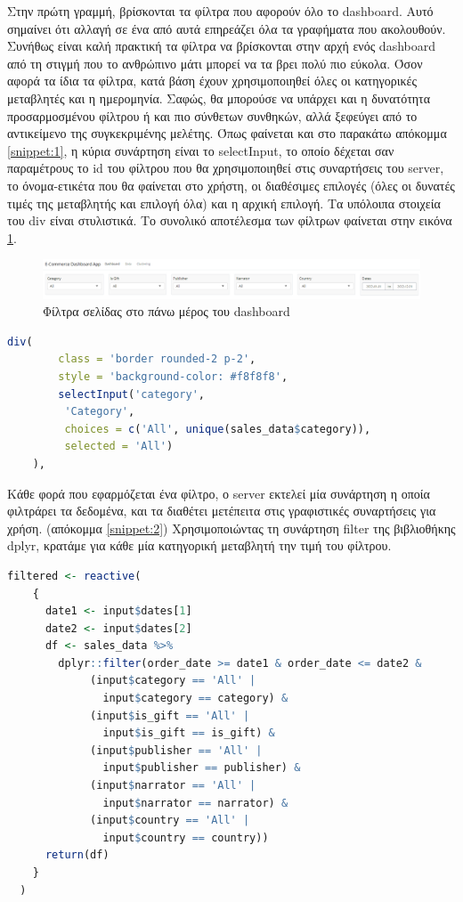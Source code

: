 \documentclass[greek, 12pt]{article}
\begin{document}
Στην πρώτη γραμμή, βρίσκονται τα φίλτρα που αφορούν όλο το dashboard. Αυτό σημαίνει ότι αλλαγή σε ένα από αυτά επηρεάζει όλα τα γραφήματα που ακολουθούν. Συνήθως είναι καλή πρακτική τα φίλτρα να βρίσκονται στην αρχή ενός dashboard από τη στιγμή που το ανθρώπινο μάτι μπορεί να τα βρει πολύ πιο εύκολα. Όσον αφορά τα ίδια τα φίλτρα, κατά βάση έχουν χρησιμοποιηθεί όλες οι κατηγορικές μεταβλητές και η ημερομηνία. Σαφώς, θα μπορούσε να υπάρχει και η δυνατότητα προσαρμοσμένου φίλτρου ή και πιο σύνθετων συνθηκών, αλλά ξεφεύγει από το αντικείμενο της συγκεκριμένης μελέτης. Όπως φαίνεται και στο παρακάτω απόκομμα \ref{snippet:1}, η κύρια συνάρτηση είναι το selectInput, το οποίο δέχεται σαν παραμέτρους το id του φίλτρου που θα χρησιμοποιηθεί στις συναρτήσεις του server, το όνομα-ετικέτα που θα φαίνεται στο χρήστη, οι διαθέσιμες επιλογές (όλες οι δυνατές τιμές της μεταβλητής και επιλογή όλα) και η αρχική επιλογή. Τα υπόλοιπα στοιχεία του div είναι στυλιστικά. Το συνολικό αποτέλεσμα των φίλτρων φαίνεται στην εικόνα \ref{fig:7}.

\begin{figure}[h]
    \centering
    \includegraphics[width=\textwidth]{pictures/7_filters.png}
    \caption{Φίλτρα σελίδας στο πάνω μέρος του dashboard}
    \label{fig:7}
\end{figure}

\begin{lstlisting}[language=R, caption=Container φίλτρων, label={snippet:1}]  
    div(
        class = 'border rounded-2 p-2',
        style = 'background-color: #f8f8f8',
        selectInput('category', 
         'Category', 
         choices = c('All', unique(sales_data$category)), 
         selected = 'All')
    ),
\end{lstlisting}

Κάθε φορά που εφαρμόζεται ένα φίλτρο, ο server εκτελεί μία συνάρτηση η οποία φιλτράρει τα δεδομένα, και τα διαθέτει μετέπειτα στις γραφιστικές συναρτήσεις για χρήση. (απόκομμα \ref{snippet:2}) Χρησιμοποιώντας τη συνάρτηση filter της βιβλιοθήκης dplyr, κρατάμε για κάθε μία κατηγορική μεταβλητή την τιμή του φίλτρου.

\begin{lstlisting}[language=R, caption=Φιλτράρισμα δεδομένων, label={snippet:2}]
    filtered <- reactive(
    {
      date1 <- input$dates[1]
      date2 <- input$dates[2]
      df <- sales_data %>%
        dplyr::filter(order_date >= date1 & order_date <= date2 &
             (input$category == 'All' |
               input$category == category) &
             (input$is_gift == 'All' |
               input$is_gift == is_gift) &
             (input$publisher == 'All' |
               input$publisher == publisher) &
             (input$narrator == 'All' |
               input$narrator == narrator) &
             (input$country == 'All' |
               input$country == country))
      return(df)
    }
  )
\end{lstlisting}
\end{document}
